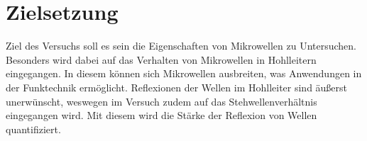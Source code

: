 \section{Zielsetzung}
\label{sec:Zielsetzung}

Ziel des Versuchs soll es sein die Eigenschaften von Mikrowellen zu Untersuchen.
Besonders wird dabei auf das Verhalten von Mikrowellen in Hohlleitern eingegangen.
In diesem können sich Mikrowellen ausbreiten, was Anwendungen in der Funktechnik ermöglicht.
Reflexionen der Wellen im Hohlleiter sind äußerst unerwünscht, weswegen im Versuch zudem auf das Stehwellenverhältnis eingegangen wird.
Mit diesem wird die Stärke der Reflexion von Wellen quantifiziert.